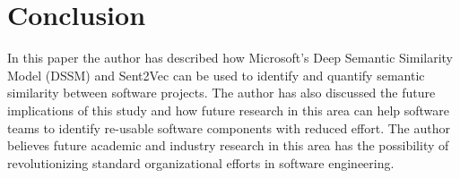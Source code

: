 \documentclass[conference]{IEEEtran}
\begin{document}
\section{Conclusion}
\label{conclusion}
 
In this paper the author has described how Microsoft's Deep Semantic Similarity Model (DSSM) and Sent2Vec can be used to identify and quantify semantic similarity between software projects. The author has also discussed the future implications of this study and how future research in this area can help software teams to identify re-usable software components with reduced effort. The author believes future academic and industry research in this area has the possibility of revolutionizing standard organizational efforts in software engineering.   
















\end{document}
